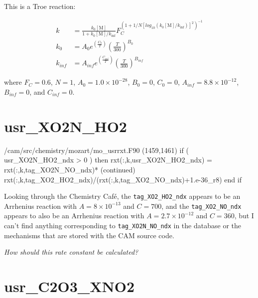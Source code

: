 \documentclass[titlepage]{article}
\begin{document}
This is a Troe reaction:

\begin{equation}
\begin{split}
k & = \frac{k_0[\mbox{M}]}{1+k_0[\mbox{M}]/k_{\inf}}F_C^{(1+1/N[log_{10}(k_0[\mbox{M}]/k_{\inf})]^2)^{-1}} \\
k_0 & = A_0 e^{\left( \frac{C_0}{T} \right)} \left( \frac{T}{300} \right)^{B_0} \\
k_{inf} & = A_{inf} e^{\left( \frac{C_{inf}}{T} \right)} \left( \frac{T}{300} \right)^{B_{inf}}
\end{split}
\end{equation}

\noindent where $F_C = 0.6$, $N = 1$, $A_0 = 1.0 \times 10^{-28}$, $B_0 = 0$, $C_0 = 0$, $A_{inf} = 8.8 \times 10^{-12}$, $B_{inf} = 0$, and $C_{inf} = 0$.



\section{usr\_XO2N\_HO2}

\begin{blockcode}[commandchars=\\\{\}]
\color{gray}/cam/src/chemistry/mozart/mo_usrrxt.F90 (1459,1461)
       if ( usr_XO2N_HO2_ndx > 0 ) then
          rxt(:,k,usr_XO2N_HO2_ndx) = rxt(:,k,tag_XO2N_NO_ndx)* \mbox{\color{black}(continued)}
            rxt(:,k,tag_XO2_HO2_ndx)/(rxt(:,k,tag_XO2_NO_ndx)+1.e-36_r8)
       end if
\end{blockcode}  

Looking through the Chemistry Caf\'{e}, the \verb>tag_XO2_HO2_ndx> appears to be an Arrhenius
reaction with $A = 8 \times 10^{-13}$ and $C = 700$, and the \verb>tag_XO2_NO_ndx> appears to
also be an Arrhenius reaction with $A = 2.7 \times 10^{-12}$ and $C = 360$, but I can't find
anything corresponding to \verb>tag_XO2N_NO_ndx> in the database or the mechanisms that are
stored with the CAM source code.

\vspace{20px}
\textit{\Large How should this rate constant be calculated?}


\section{usr\_C2O3\_XNO2}
\end{document}
